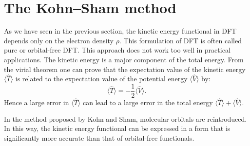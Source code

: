 \documentclass[../Main/chem532-notes.tex]{subfiles}
\begin{document}
\section{The Kohn--Sham method}
As we have seen in the previous section, the kinetic energy functional in DFT depends only on the electron density $\rho$.
This formulation of DFT is often called pure or orbital-free DFT.
This approach does not work too well in practical applications.
The kinetic energy is a major component of the total energy. From the virial theorem one can prove that the expectation value of the kinetic energy $\langle \hat{T} \rangle$ is related to the expectation value of the potential energy $\langle \hat{V} \rangle$ by:
\begin{equation}
\langle \hat{T} \rangle = -\frac{1}{2} \langle \hat{V} \rangle.
\end{equation}
Hence a large error in $\langle \hat{T} \rangle$ can lead to a large error in the total energy $\langle \hat{T} \rangle + \langle \hat{V} \rangle$.

In the method proposed by Kohn and Sham, molecular orbitals are reintroduced. In this way, the kinetic energy functional can be expressed in a form that is significantly more accurate than that of orbital-free functionals.
\end{document}
